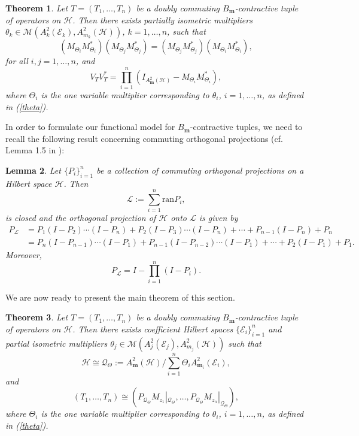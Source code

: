 \documentclass[12pt]{amsart}
\newtheorem{Theorem}{\sc Theorem}[section]
\newtheorem{Lemma}[Theorem]{\sc Lemma}
\begin{document}
\begin{Theorem}\label{VTheta}
Let $T = (T_1, \ldots, T_n)$ be a doubly commuting
$B_{\bm{m}}$-contractive tuple of operators on ${\mathcal{H}}$. Then there exists
partially isometric multipliers $\theta_k \in {\mathcal{M}}(A^2_k({\mathcal{E}}_k),
A^2_{m_k}({\mathcal{H}}))$, $k = 1, \ldots, n$, such that \[(M_{\Theta_i}
M_{\Theta_i}^*) (M_{\Theta_j} M_{\Theta_j}^*) = (M_{\Theta_j}
M_{\Theta_j}^*) (M_{\Theta_i} M_{\Theta_i}^*),\]for all $i, j = 1,
\ldots, n$, and\[V_T V_T^* = \prod_{i=1}^n (I_{A^2_{\bm{m}}({\mathcal{H}})} -
M_{\Theta_i} M_{\Theta_i}^*),\]where $\Theta_i$ is the one variable
multiplier corresponding to $\theta_i$,  $i = 1, \ldots, n$, as
defined in (\ref{theta}).
\end{Theorem}

In order to formulate our functional model for $B_{\bm{m}}$-contractive
tuples, we need to recall the following result concerning commuting
orthogonal projections (cf. Lemma 1.5 in \cite{S-JOT}):

\begin{Lemma}\label{P-F} Let $\{P_i\}_{i=1}^n$ be a collection of commuting orthogonal
projections on a Hilbert space ${\mathcal{H}}$. Then \[{\mathcal{L}} :=
\mathop{\sum}_{i=1}^n \mbox{ran} P_i,\] is closed and the orthogonal
projection of ${\mathcal{H}}$ onto ${\mathcal{L}}$ is given by
\[\begin{split}P_{\mathcal{L}} & = P_1 (I - P_2) \cdots (I - P_n) +
P_2 (I - P_3) \cdots (I - P_n) + \cdots + P_{n-1} (I - P_n) + P_n\\
& = P_n (I - P_{n-1}) \cdots (I - P_1) + P_{n-1} (I - P_{n-2})
\cdots (I - P_1) + \cdots + P_2 (I - P_1) +
P_1.\end{split}\]Moreover,
\[P_{\mathcal{L}} = I - \mathop{\prod}_{i=1}^n (I - P_i).\]
\end{Lemma}

We are now ready to present the main theorem of this section.

\begin{Theorem}\label{MT}
Let $T = (T_1, \ldots, T_n)$ be a doubly commuting
$B_{\bm{m}}$-contractive tuple of operators on ${\mathcal{H}}$. Then there exists
coefficient Hilbert spaces $\{{\mathcal{E}}_i\}_{i=1}^n$ and partial
isometric multipliers $\theta_j \in {\mathcal{M}}(A^2_j({\mathcal{E}}_j),
A^2_{m_j}({\mathcal{H}}))$ such that \[{\mathcal{H}} \cong {\mathcal{Q}}_{\Theta} :=
A^2_{\bm{m}}({\mathcal{H}})/ \sum_{i=1}^n \Theta_i A^2_{{\bm{m}}_i}({\mathcal{E}}_i),\] and
\[(T_1, \ldots, T_n) \cong (P_{{\mathcal{Q}}_{\Theta}}
M_{z_1}|_{{\mathcal{Q}}_{\Theta}}, \ldots, P_{{\mathcal{Q}}_{\Theta}}
M_{z_n}|_{{\mathcal{Q}}_{\Theta}}),\]where $\Theta_i$ is the one variable
multiplier corresponding to $\theta_i$,  $i = 1, \ldots, n$, as
defined in (\ref{theta}).
\end{Theorem}
\end{document}
